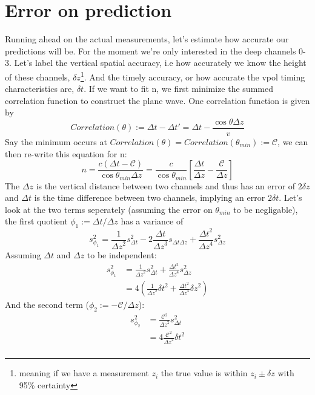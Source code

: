 \documentclass[11pt,a4paper,faculty=we,language=en,doctype=report]{cls/ugent-doc}
\begin{document}
\section{Error on prediction}
Running ahead on the actual measurements, let's estimate how accurate our
predictions will be.  For the moment we're only
interested in the deep channels 0-3. Let's label the vertical spatial accuracy,
i.e how accurately we know the height of these channels, $\delta z$\footnote{meaning if we have a measurement $z_i$ the true value is within $z_i
\pm \delta z$ with 95\% certainty}. And the timely accuracy, or how accurate the
vpol timing characteristics are, $\delta t$. If we want to fit n, we first
minimize the summed correlation function to construct the plane wave. One
correlation function is given by 
\begin{equation}
	Correlation(\theta) := \Delta t - \Delta t' = \Delta t
	- \frac{\cos\theta \Delta z}{v}
\end{equation}
Say the minimum occurs at $Correlation(\theta) = Correlation(\theta_{min}) := \mathcal{C}$, we can then re-write 
this equation for n:
\begin{equation}
  n = \frac{c(\Delta t - \mathcal{C})}{\cos \theta_{min} \Delta z} = \frac{c}{\cos{\theta_{min}}}\left[\frac{\Delta t}{\Delta z} - \frac{\mathcal{C}}{\Delta z}\right]
\end{equation}
The $\Delta z$ is the vertical distance between two channels and thus has an error of $2\delta z$ and $\Delta t$ is the time
difference between two channels, implying an error $2\delta t$. 
Let's look at the two terms seperately (assuming the error on $\theta_{min}$ to be negligable),
the first quotient $\phi_1 := \Delta t/\Delta z$ has a variance \cite{grabe2005measurement} of
\begin{equation}
	s_{\phi_1}^2 = \frac{1}{{\Delta z}^2}s_{\Delta t}^2 - 2 \frac{{\Delta t}}{{\Delta z}^3}s_{\Delta t \Delta z} + \frac{{\Delta t}^2}{{\Delta z}^4}s_{\Delta z}^2
\end{equation}
Assuming $\Delta t$ and $\Delta z$ to be independent:
\begin{align}
	s_{\phi_1}^2 &= \frac{1}{{\Delta z}^2}s_{\Delta t}^2 + \frac{{\Delta t}^2}{{\Delta z}^4}s_{\Delta z}^2\\
	&= 4\left(\frac{1}{{\Delta z}^2}{\delta t}^2 + \frac{{\Delta t}^2}{{\Delta z}^4}{\delta z}^2\right)
\end{align}
And the second term ($\phi_2 := -\mathcal{C}/\Delta z$):
\begin{align}
	s_{\phi_2}^2 &= \frac{\mathcal{C}^2}{{\Delta z}^2}s_{\Delta t}^2\\
		     &= 4\frac{\mathcal{C}^2}{{\Delta z}^2}{\delta t}^2\\
\end{align}
\end{document}

